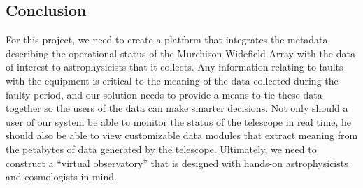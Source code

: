 \documentclass[12pt]{article}
\begin{document}
\begin{spacing}{1.5}
\newpage

\section{Conclusion}
For this project, we need to create a platform that integrates the metadata describing the operational status of the Murchison Widefield Array with the data  of interest to astrophysicists that it collects. Any information relating to faults with the equipment is critical to the meaning of the data collected during the faulty period, and our solution needs to provide a means to tie these data together so the users of the data can make smarter decisions. Not only should a user of our system be able to monitor the status of the telescope in real time, he should also be able to view customizable data modules that extract meaning from the petabytes of data generated by the telescope. Ultimately, we need to construct a ``virtual observatory'' that is designed with hands-on astrophysicists and cosmologists in mind.

\end{spacing}
\end{document}
